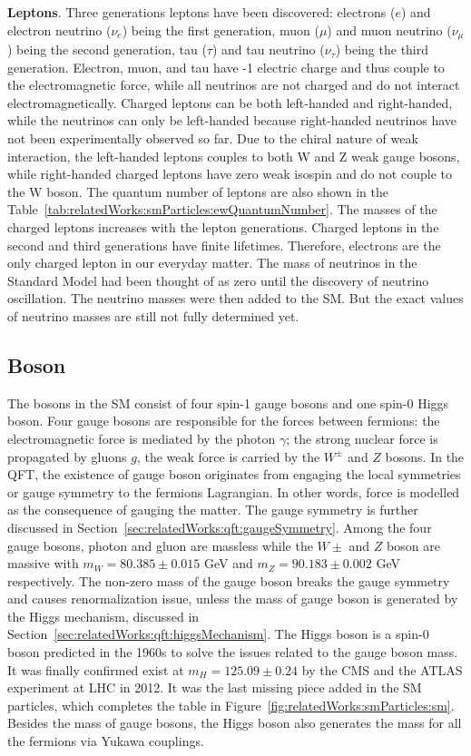 \textbf{Leptons}. Three generations leptons have been discovered: electrons ($e$) and electron neutrino ($\nu_e$) being the first generation, muon ($\mu$) and muon neutrino ($\nu_\mu$) being the second generation, tau ($\tau$) and tau neutrino ($\nu_\tau$) being the third generation. Electron, muon, and tau have -1 electric charge and thus couple to the electromagnetic force, while all neutrinos are not charged and do not interact electromagnetically. Charged leptons can be both left-handed and right-handed, while the neutrinos can only be left-handed because right-handed neutrinos have not been experimentally observed so far. Due to the chiral nature of weak interaction, the left-handed leptons couples to both W and Z weak gauge bosons, while right-handed charged leptons have zero weak isospin and do not couple to the W boson. The quantum number of leptons are also shown in the Table~\ref{tab:relatedWorks:smParticles:ewQuantumNumber}. The masses of the charged leptons increases with the lepton generations. Charged leptons in the second and third generations have finite lifetimes. Therefore, electrons are the only charged lepton in our everyday matter. The mass of neutrinos in the Standard Model had been thought of as zero until the discovery of neutrino oscillation. The neutrino masses were then added to the SM. But the exact values of neutrino masses are still not fully determined yet. 




\subsection{Boson}
\label{sec:relatedWorks:smParticles:boson}

The bosons in the SM consist of four spin-1 gauge bosons and one spin-0 Higgs boson. Four gauge bosons are responsible for the forces between fermions: the electromagnetic force is mediated by the photon $\gamma$; the strong nuclear force is propagated by gluons $g$, the weak force is carried by the $W^\pm$ and $Z$ bosons. In the QFT, the existence of gauge boson originates from engaging the local symmetries or gauge symmetry to the fermions Lagrangian. In other words, force is modelled as the consequence of gauging the matter. The gauge symmetry is further discussed in Section~\ref{sec:relatedWorks:qft:gaugeSymmetry}. Among the four gauge bosons, photon and gluon are massless while the $W\pm$ and $Z$ boson are massive with $m_W = 80.385\pm0.015$ GeV and $m_Z = 90.183\pm 0.002$ GeV \cite{pdg2020} respectively. The non-zero mass of the gauge boson breaks the gauge symmetry and causes renormalization issue, unless the mass of gauge boson is generated by the Higgs mechanism, discussed in Section~\ref{sec:relatedWorks:qft:higgsMechanism}. The Higgs boson is a spin-0 boson predicted in the 1960s to solve the issues related to the gauge boson mass. It was finally confirmed exist at $m_H=125.09\pm 0.24$ \GeV by the CMS \cite{Chatrchyan:2012ufa} and the ATLAS \cite{Aad:2012tfa} experiment at LHC in 2012. It was the last missing piece added in the SM particles, which completes the table in Figure~\ref{fig:relatedWorks:smParticles:sm}. Besides the mass of gauge bosons, the Higgs boson also generates the mass for all the fermions via Yukawa couplings.

